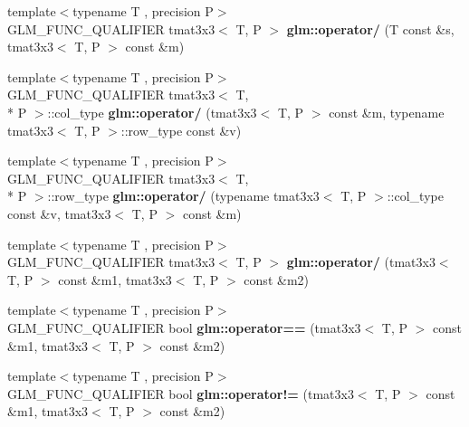 \begin{DoxyCompactItemize}
\item 
\hypertarget{namespaceglm_a7d4f89aa05e37451317e56564a22c6c2}{{\footnotesize template$<$typename T , precision P$>$ }\\G\-L\-M\-\_\-\-F\-U\-N\-C\-\_\-\-Q\-U\-A\-L\-I\-F\-I\-E\-R tmat3x3$<$ T, P $>$ {\bfseries glm\-::operator/} (T const \&s, tmat3x3$<$ T, P $>$ const \&m)}\label{namespaceglm_a7d4f89aa05e37451317e56564a22c6c2}

\item 
\hypertarget{namespaceglm_ae0b7424ac335fe54c985e67c531176c0}{{\footnotesize template$<$typename T , precision P$>$ }\\G\-L\-M\-\_\-\-F\-U\-N\-C\-\_\-\-Q\-U\-A\-L\-I\-F\-I\-E\-R tmat3x3$<$ T, \\*
P $>$\-::col\-\_\-type {\bfseries glm\-::operator/} (tmat3x3$<$ T, P $>$ const \&m, typename tmat3x3$<$ T, P $>$\-::row\-\_\-type const \&v)}\label{namespaceglm_ae0b7424ac335fe54c985e67c531176c0}

\item 
\hypertarget{namespaceglm_a8c3f939040ea3ca3707ce7d0b36b9b91}{{\footnotesize template$<$typename T , precision P$>$ }\\G\-L\-M\-\_\-\-F\-U\-N\-C\-\_\-\-Q\-U\-A\-L\-I\-F\-I\-E\-R tmat3x3$<$ T, \\*
P $>$\-::row\-\_\-type {\bfseries glm\-::operator/} (typename tmat3x3$<$ T, P $>$\-::col\-\_\-type const \&v, tmat3x3$<$ T, P $>$ const \&m)}\label{namespaceglm_a8c3f939040ea3ca3707ce7d0b36b9b91}

\item 
\hypertarget{namespaceglm_a5671c0e99b001cb443a8f05a62985ccf}{{\footnotesize template$<$typename T , precision P$>$ }\\G\-L\-M\-\_\-\-F\-U\-N\-C\-\_\-\-Q\-U\-A\-L\-I\-F\-I\-E\-R tmat3x3$<$ T, P $>$ {\bfseries glm\-::operator/} (tmat3x3$<$ T, P $>$ const \&m1, tmat3x3$<$ T, P $>$ const \&m2)}\label{namespaceglm_a5671c0e99b001cb443a8f05a62985ccf}

\item 
\hypertarget{namespaceglm_aaa61456c0ed2eed3acbf27b2ab797dee}{{\footnotesize template$<$typename T , precision P$>$ }\\G\-L\-M\-\_\-\-F\-U\-N\-C\-\_\-\-Q\-U\-A\-L\-I\-F\-I\-E\-R bool {\bfseries glm\-::operator==} (tmat3x3$<$ T, P $>$ const \&m1, tmat3x3$<$ T, P $>$ const \&m2)}\label{namespaceglm_aaa61456c0ed2eed3acbf27b2ab797dee}

\item 
\hypertarget{namespaceglm_a14702a5f8ce75f873a43422e77b5c818}{{\footnotesize template$<$typename T , precision P$>$ }\\G\-L\-M\-\_\-\-F\-U\-N\-C\-\_\-\-Q\-U\-A\-L\-I\-F\-I\-E\-R bool {\bfseries glm\-::operator!=} (tmat3x3$<$ T, P $>$ const \&m1, tmat3x3$<$ T, P $>$ const \&m2)}\label{namespaceglm_a14702a5f8ce75f873a43422e77b5c818}

\end{DoxyCompactItemize}


